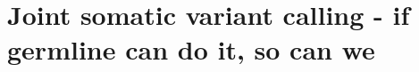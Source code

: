 \chapter[Joint somatic variant calling]{Joint somatic variant calling - if germline can do it, so can we}
\label{ch:variantcalling}










